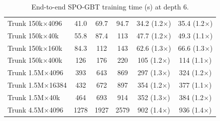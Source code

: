 \begin{table}[p]
\begin{tabular}{l|ccc|cc}
        Trunk 150k$\times$4096 & 41.0 & 69.7 & 94.7 & 34.2 (1.2$\times$) & 35.4 (1.2$\times$) \\
        Trunk 150k$\times$40k & 55.8 & 87.4 & 113 & 47.7 (1.2$\times$) & 49.3 (1.1$\times$) \\
        Trunk 150k$\times$160k & 84.3 & 112 & 143 & 62.6 (1.3$\times$) & 66.6 (1.3$\times$) \\
        Trunk 150k$\times$400k & 126 & 176 & 220 & 105 (1.2$\times$) & 114 (1.1$\times$) \\
        Trunk 1.5M$\times$4096 & 393 & 643 & 869 & 297 (1.3$\times$) & 324 (1.2$\times$) \\
        Trunk 1.5M$\times$16384 & 432 & 672 & 897 & 354 (1.2$\times$) & 377 (1.1$\times$) \\
        Trunk 1.5M$\times$40k & 464 & 693 & 914 & 352 (1.3$\times$) & 384 (1.2$\times$) \\
        Trunk 4.5M$\times$4096 & 1278 & 1927 & 2579 & 902 (1.4$\times$) & 936 (1.4$\times$) \\
        \hline
    \end{tabular}
    \caption{End-to-end SPO-GBT training time (s) at depth 6.}
    \label{tab:overall-gbt}
\end{table}
